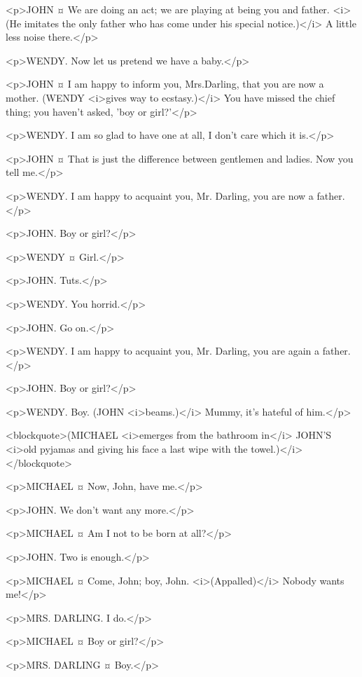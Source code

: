 <p>JOHN ¤
We are doing an act; we are playing at being you and father. <i>(He imitates the only father who has come under his special notice.)</i> A little less noise there.</p>

<p>WENDY. Now let us pretend we have a baby.</p>

<p>JOHN ¤
I am happy to inform you, Mrs.Darling, that you are now a mother. (WENDY <i>gives way to ecstasy.)</i> You have missed the chief thing; you haven't asked, 'boy or girl?'</p>

<p>WENDY. I am so glad to have one at all, I don't care which it is.</p>

<p>JOHN ¤
That is just the difference between gentlemen and ladies. Now you tell me.</p>

<p>WENDY. I am happy to acquaint you, Mr. Darling, you are now a father.</p>

<p>JOHN. Boy or girl?</p>

<p>WENDY ¤
Girl.</p>

<p>JOHN. Tuts.</p>

<p>WENDY. You horrid.</p>

<p>JOHN. Go on.</p>

<p>WENDY. I am happy to acquaint you, Mr. Darling, you are again a father.</p>

<p>JOHN. Boy or girl?</p>

<p>WENDY. Boy. (JOHN <i>beams.)</i> Mummy, it's hateful of him.</p>

<blockquote>(MICHAEL <i>emerges from the bathroom in</i> JOHN'S <i>old pyjamas and giving his face a last wipe with the towel.)</i></blockquote>

<p>MICHAEL ¤
Now, John, have me.</p>

<p>JOHN. We don't want any more.</p>

<p>MICHAEL ¤
Am I not to be born at all?</p>

<p>JOHN. Two is enough.</p>

<p>MICHAEL ¤
Come, John; boy, John. <i>(Appalled)</i> Nobody wants me!</p>

<p>MRS. DARLING. I do.</p>

<p>MICHAEL ¤
Boy or girl?</p>

<p>MRS. DARLING ¤
Boy.</p>


